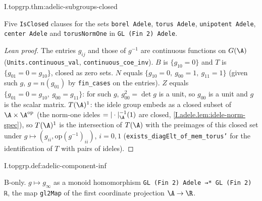 \begin{theorem}
\end{theorem}
\begin{tfformal}{I.topgrp.thm:adelic-subgroups-closed}
\begin{tffidelity}
Five \texttt{IsClosed} clauses for the sets \texttt{borel Adele}, \texttt{torus Adele}, \texttt{unipotent Adele}, \texttt{center Adele} and \texttt{torusNormOne} in \texttt{GL (Fin 2) Adele}.
\end{tffidelity}
\end{tfformal}
\begin{proof}[Lean proof]
The entries $g_{ij}$ and those of $g^{-1}$ are continuous functions on $G(\A)$ (\texttt{Units.continuous\_val}, \texttt{continuous\_coe\_inv}). $B$ is $\{g_{10}=0\}$ and $T$ is $\{g_{01}=0=g_{10}\}$, closed as zero sets. $N$ equals $\{g_{10}=0,\ g_{00}=1,\ g_{11}=1\}$ (given such $g$, $g=n(g_{01})$ by \texttt{fin\_cases} on the entries). $Z$ equals $\{g_{01}=0=g_{10},\ g_{00}=g_{11}\}$: for such $g$, $g_{00}^2=\det g$ is a unit, so $g_{00}$ is a unit and $g$ is the scalar matrix. $T(\A)^1$: the idele group embeds as a closed subset of $\A\times\A^{\mathrm{op}}$ (the norm-one ideles $=|\cdot|_\A^{-1}(1)$ are closed, \cref{I.adele.lem:idele-norm-spec}), so $T(\A)^1$ is the intersection of $T(\A)$ with the preimages of this closed set under $g\mapsto(g_{ii},\mathrm{op}(g^{-1})_{ii})$, $i=0,1$ (\texttt{exists\_diagElt\_of\_mem\_torus'} for the identification of $T$ with pairs of ideles).
\end{proof}

\begin{definition}
\bonly
{}
\end{definition}
\begin{tfformal}{I.topgrp.def:adelic-component-inf}
\begin{tffidelity}
B-only. $g\mapsto g_\infty$ as a monoid homomorphism \texttt{GL (Fin 2) Adele →* GL (Fin 2) ℝ}, the map \texttt{gl2Map} of the first coordinate projection $\A\to\R$.
\end{tffidelity}
\end{tfformal}

